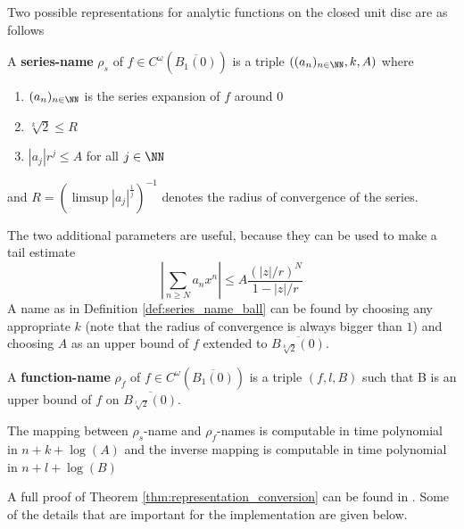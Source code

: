 	 Two possible representations for analytic functions on the closed unit disc are as follows
	 \begin{definition}\label{def:series_name_ball}
	 	A \textbf{series-name} $\rho_s$ of $f \in C^\omega(\overline{B_1(0)})$ is a triple $((a_n)_{n \in \NN}, k, A)$ where 
	 	\begin{enumerate}
	 		\item $(a_n)_{n \in \NN}$ is the series expansion of $f$ around $0$
	 		\item $\sqrt[k]{2} \leq R$ 
	 		\item $|a_j|r^j \leq A$ for all $j \in \NN$
	 	\end{enumerate}
	 	and $R = (\limsup |a_j|^{\frac{1}{j}})^{-1}$ denotes the radius of convergence of the series.
	 \end{definition}
	 The two additional parameters are useful, because they can be used to make a tail estimate 
	 \begin{equation}\label{eqn:tail_estimate}
	  \left | \sum_{n \geq N} a_nx^n \right | \leq A \frac{(|z|/r)^N}{1-|z|/r}
	 \end{equation}
	 A name as in Definition \ref{def:series_name_ball} can be found by choosing any appropriate $k$ (note that the radius of convergence is always bigger than $1$) and choosing $A$ as an upper bound of $f$ extended to $\overline{B_{\sqrt[k]{2}}(0)}$. 
	 \begin{definition}\label{def: function name ball}
	 	A \textbf{function-name} $\rho_f$ of $f \in C^\omega(\overline{B_1(0)})$ is a triple $(f, l, B)$ such that
		B is an upper bound of $f$ on $\overline{B_{\sqrt[l]{2}}(0)}$.
	 \end{definition}
	 \begin{theorem}\cite{Kaw}\label{thm:representation_conversion}
	 	The mapping between $\rho_s$-name and $\rho_f$-names is computable in time polynomial in 
	 	$n+k+\log(A)$ and the inverse mapping is computable in time polynomial in $n+l+\log(B)$ 
	 \end{theorem}
	 A full proof of Theorem \ref{thm:representation_conversion} can be found in \cite{Kaw}. 
	 Some of the details that are important for the implementation are given below.
